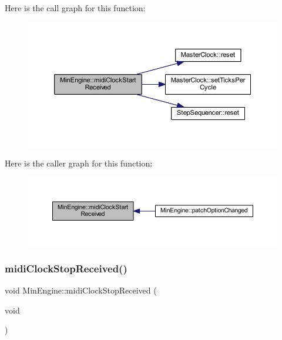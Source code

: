 Here is the call graph for this function\+:
\nopagebreak
\begin{figure}[H]
\begin{center}
\leavevmode
\includegraphics[width=350pt]{d4/d0f/class_min_engine_ad0378027f052b780481611fa4335b68d_cgraph}
\end{center}
\end{figure}
Here is the caller graph for this function\+:
\nopagebreak
\begin{figure}[H]
\begin{center}
\leavevmode
\includegraphics[width=350pt]{d4/d0f/class_min_engine_ad0378027f052b780481611fa4335b68d_icgraph}
\end{center}
\end{figure}
\mbox{\label{class_min_engine_a08ac0328006e01f44ffbb3c78f4f504a}} 
\subsubsection{\texorpdfstring{midi\+Clock\+Stop\+Received()}{midiClockStopReceived()}}
{\footnotesize\ttfamily void Min\+Engine\+::midi\+Clock\+Stop\+Received (\begin{DoxyParamCaption}\item[{void}]{ }\end{DoxyParamCaption})\hspace{0.3cm}{\ttfamily [virtual]}}



